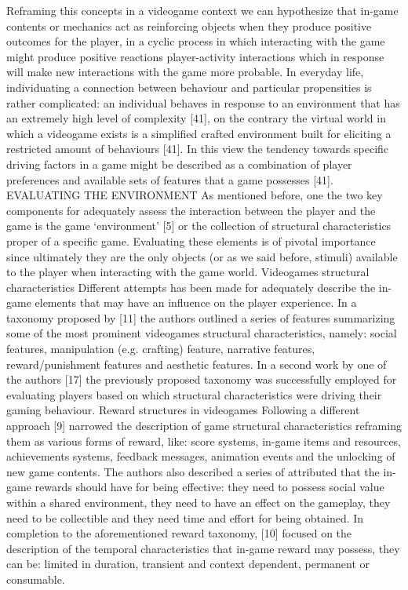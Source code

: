 Reframing this concepts in a videogame context we can hypothesize that in-game contents or mechanics act as reinforcing objects when they produce positive outcomes for the player, in a cyclic process in which interacting with the game might produce positive reactions player-activity interactions which in response will make new interactions with the game more probable. 
In everyday life, individuating a connection between behaviour and particular propensities is rather complicated:  an individual behaves in response to an environment that has an extremely high level of complexity [41], on the contrary the virtual world in which a videogame exists is a simplified crafted environment built for eliciting a restricted amount of behaviours [41]. In this view the tendency towards specific driving factors in a game might be described as a combination of player preferences and available sets of features that a game possesses [41].
EVALUATING THE ENVIRONMENT
As mentioned before, one the two key components for adequately assess the interaction between the player and the game is the game ‘environment’ [5] or the collection of structural characteristics proper of a specific game. Evaluating these elements is of pivotal importance since ultimately they are the only objects (or as we said before, stimuli) available to the player when interacting with the game world. 
Videogames structural characteristics
Different attempts has been made for adequately describe the in-game elements that may have an influence on the player experience. In a taxonomy proposed by [11] the authors outlined a series of features summarizing some of the most prominent videogames structural characteristics, namely: social features, manipulation (e.g. crafting) feature, narrative features, reward/punishment features and aesthetic features. In a second work by one of the authors [17] the previously proposed taxonomy was successfully employed for evaluating players based on which structural characteristics were driving their gaming behaviour. 
Reward structures in videogames
Following a different approach [9] narrowed the description of game structural characteristics reframing them as various forms of reward, like: score systems, in-game items and resources, achievements systems, feedback messages, animation events and the unlocking of new game contents. The authors also described a series of attributed that the in-game rewards should have for being effective: they need to possess social value within a shared environment, they need to have an effect on the gameplay, they need to be collectible and they need time and effort for being obtained. In completion to the aforementioned reward taxonomy, [10] focused on the description of the temporal characteristics that in-game reward may possess, they can be: limited in duration, transient and context dependent, permanent or consumable. 
